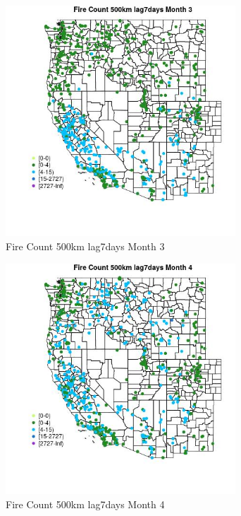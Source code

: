 \begin{figure} 
\centering  
\includegraphics[width=0.77\textwidth]{Code_Outputs/Report_ML_input_PM25_Step4_part_f_de_duplicated_aveswNAs_MapObsMo3Fire_Count_500km_lag7days.jpg} 
\caption{\label{fig:Report_ML_input_PM25_Step4_part_f_de_duplicated_aveswNAsMapObsMo3Fire_Count_500km_lag7days}Fire Count 500km lag7days Month 3} 
\end{figure} 
 

\begin{figure} 
\centering  
\includegraphics[width=0.77\textwidth]{Code_Outputs/Report_ML_input_PM25_Step4_part_f_de_duplicated_aveswNAs_MapObsMo4Fire_Count_500km_lag7days.jpg} 
\caption{\label{fig:Report_ML_input_PM25_Step4_part_f_de_duplicated_aveswNAsMapObsMo4Fire_Count_500km_lag7days}Fire Count 500km lag7days Month 4} 
\end{figure} 
 

